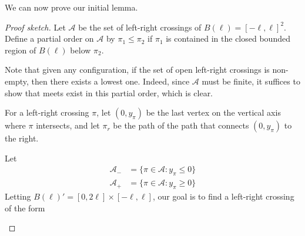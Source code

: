 \documentclass[a4paper]{article}
\begin{document}
We can now prove our initial lemma.
\begin{proof}[Proof sketch]
  Let $\mathcal{A}$ be the set of left-right crossings of $B(\ell) = [-\ell, \ell]^2$. Define a partial order on $\mathcal{A}$ by $\pi_1 \leq \pi_2$ if $\pi_1$ is contained in the closed bounded region of $B(\ell)$ below $\pi_2$.

  Note that given any configuration, if the set of open left-right crossings is non-empty, then there exists a lowest one. Indeed, since $\mathcal{A}$ must be finite, it suffices to show that meets exist in this partial order, which is clear.

  For a left-right crossing $\pi$, let $(0, y_\pi)$ be the last vertex on the vertical axis where $\pi$ intersects, and let $\pi_r$ be the path of the path that connects $(0, y_\pi)$ to the right.
  \begin{center}
  \end{center}
  Let
  \begin{align*}
    \mathcal{A}_- &= \{\pi \in \mathcal{A}: y_\pi \leq 0\}\\
    \mathcal{A}_+ &= \{\pi \in \mathcal{A}: y_\pi \geq 0\}
  \end{align*}
   Letting $B(\ell)' = [0, 2\ell] \times [-\ell, \ell]$, our goal is to find a left-right crossing of the form
  \begin{center}
\end{center}
\end{proof}
\end{document}
